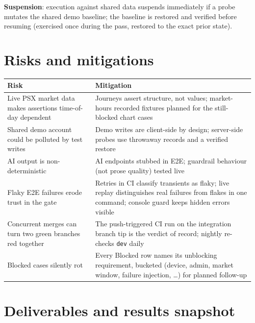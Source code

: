 \documentclass[11pt,a4paper]{article}
\begin{document}
\textbf{Suspension}: execution against shared data suspends immediately if a probe
mutates the shared demo baseline; the baseline is restored and verified before
resuming (exercised once during the pass, restored to the exact prior state).

\section{Risks and mitigations}

\begin{center}
\small
\begin{tabularx}{\textwidth}{LL}
\toprule
\textbf{Risk} & \textbf{Mitigation} \\
\midrule
Live PSX market data makes assertions time-of-day dependent & Journeys assert structure, not values; market-hours recorded fixtures planned for the still-blocked chart cases \\
Shared demo account could be polluted by test writes & Demo writes are client-side by design; server-side probes use throwaway records and a verified restore \\
AI output is non-deterministic & AI endpoints stubbed in E2E; guardrail behaviour (not prose quality) tested live \\
Flaky E2E failures erode trust in the gate & Retries in CI classify transients as flaky; live replay distinguishes real failures from flakes in one command; console guard keeps hidden errors visible \\
Concurrent merges can turn two green branches red together & The push-triggered CI run on the integration branch tip is the verdict of record; nightly re-checks \texttt{dev} daily \\
Blocked cases silently rot & Every Blocked row names its unblocking requirement, bucketed (device, admin, market window, failure injection, \ldots) for planned follow-up \\
\bottomrule
\end{tabularx}
\end{center}

\section{Deliverables and results snapshot}
\end{document}
